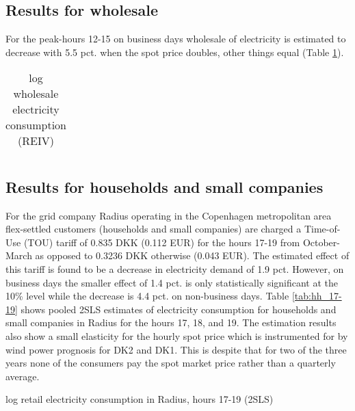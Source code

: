 \label{sec:results}
\subsection{Results for wholesale}
\label{subsec:r_wholesale}
For the peak-hours 12-15 on business days wholesale of electricity is estimated to decrease with 5.5 pct. when the spot price doubles, other things equal (Table \ref{tab:ws_preferred}).
\begin{table}[H]
  \vspace{-0.0cm}
  \centering
  \caption{log wholesale electricity consumption (REIV)}
  \footnotesize
    \begin{tabular}{lcccc}
      \toprule
        
    \end{tabular}
  \label{tab:ws_preferred}
  \vspace{-0.0cm}
\end{table}


\subsection{Results for households and small companies}
\label{subsec:r_households}
For the grid company Radius operating in the Copenhagen metropolitan area flex-settled customers (households and small companies) are charged a Time-of-Use (TOU) tariff of 0.835 DKK (0.112 EUR) for the hours 17-19 from October-March as opposed to 0.3236 DKK otherwise (0.043 EUR). The estimated effect of this tariff is found to be a decrease in electricity demand of 1.9 pct. However, on business days the smaller effect of 1.4 pct. is only statistically significant at the 10\% level while the decrease is 4.4 pct. on non-business days. Table \ref{tab:hh_17-19} shows pooled 2SLS estimates of electricity consumption for households and small companies in Radius for the hours 17, 18, and 19. The estimation results also show a small elasticity for the hourly spot price which is instrumented for by wind power prognosis for DK2 and DK1. This is despite that for two of the three years none of the consumers pay the spot market price rather than a quarterly average.
\begin{table}[H]
  \vspace{-0.0cm}
  \centering
  \caption{log retail electricity consumption in Radius, hours 17-19 (2SLS)}
  \footnotesize
        
  \label{tab:hh_17-19}
  \vspace{-0.0cm}
\end{table}


